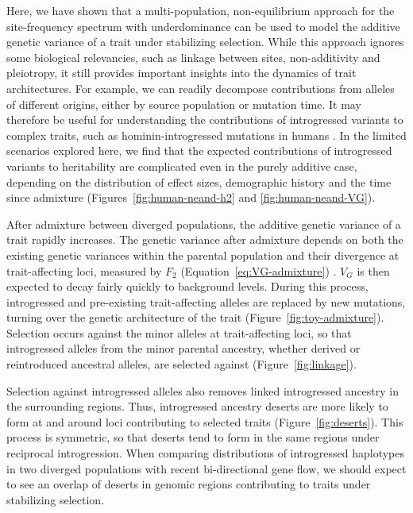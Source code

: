 \documentclass{article}
\begin{document}
Here, we have shown that a multi-population, non-equilibrium approach for the
site-frequency spectrum with underdominance can be used to model the additive
genetic variance of a trait under stabilizing selection. While this approach
ignores some biological relevancies, such as linkage between sites,
non-additivity and pleiotropy, it still provides important insights into the
dynamics of trait architectures. For example, we can readily decompose
contributions from alleles of different origins, either by source population or
mutation time. It may therefore be useful for understanding the contributions
of introgressed variants to complex traits, such as hominin-introgressed
mutations in humans \citep{reilly2022contribution, wei2023lingering}. In the
limited scenarios explored here, we find that the expected contributions of
introgressed variants to heritability are complicated even in the purely
additive case, depending on the distribution of effect sizes, demographic
history and the time since admixture (Figures~\ref{fig:human-neand-h2} and
\ref{fig:human-neand-VG}).

After admixture between diverged populations, the additive genetic variance of
a trait rapidly increases. The genetic variance after admixture depends on both
the existing genetic variances within the parental population and their
divergence at trait-affecting loci, measured by $F_2$
(Equation~\ref{eq:VG-admixture}) \citep[see also,][]{veller2024stabilizing}.
$V_G$ is then expected to decay fairly quickly to background levels. During
this process, introgressed and pre-existing trait-affecting alleles are
replaced by new mutations, turning over the genetic architecture of the trait
(Figure~\ref{fig:toy-admixture}).  Selection occurs against the minor alleles
at trait-affecting loci, so that introgressed alleles from the minor parental
ancestry, whether derived or reintroduced ancestral alleles, are selected
against (Figure~\ref{fig:linkage}).

Selection against introgressed alleles also removes linked introgressed
ancestry in the surrounding regions. Thus, introgressed ancestry deserts are
more likely to form at and around loci contributing to selected traits
(Figure~\ref{fig:deserts}). This process is symmetric, so that deserts tend to
form in the same regions under reciprocal introgression. When comparing
distributions of introgressed haplotypes in two diverged populations with
recent bi-directional gene flow, we should expect to see an overlap of deserts
in genomic regions contributing to traits under stabilizing selection.
\end{document}
